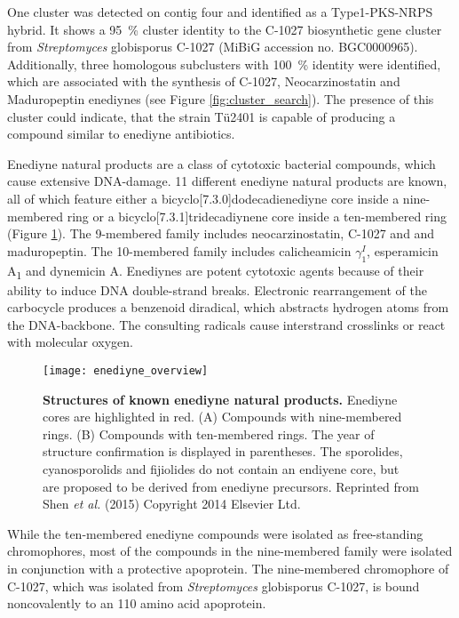 	 One cluster was detected on contig four and identified as a Type1-PKS-NRPS hybrid.
	 It shows a 95~\% cluster identity to the C-1027 biosynthetic gene cluster from \textit{Streptomyces} globisporus C-1027 (MiBiG accession no. BGC0000965). Additionally, three homologous subclusters with 100~\% identity were identified, which are associated with the synthesis of C-1027, Neocarzinostatin and Maduropeptin enediynes (see Figure \ref{fig:cluster_search}).
	 The presence of this cluster could indicate, that the strain Tü2401 is capable of producing a compound similar to enediyne antibiotics. 
	 
	 Enediyne natural products are a class of cytotoxic bacterial compounds, which cause extensive DNA-damage.\autocite{Liang2010,Gredicak2007,AdrianL.Smith*1996,Nicolaou1993}
	 11 different enediyne natural products are known, all of which feature either a bicyclo[7.3.0]dodecadienediyne core inside a nine-membered ring or a bicyclo[7.3.1]tridecadiynene core inside a ten-membered ring (Figure \ref{fig:enediyne_comparison}).
	 The 9-membered family includes neocarzinostatin, C-1027 and and maduropeptin.
	 The 10-membered family includes calicheamicin $\gamma_{1}^{I}$, esperamicin A\textsubscript{1} and dynemicin A.\autocite{Liang2010}
	 Enediynes are potent cytotoxic agents because of their ability to induce DNA double-strand breaks.\autocite{Shen2015}
	 Electronic rearrangement of the carbocycle produces a benzenoid diradical, which abstracts hydrogen atoms from the DNA-backbone.
	 The consulting radicals cause interstrand crosslinks or react with molecular oxygen.	 
	 \begin{figure}[htbp]
	 	\centering
	 	\texttt{[image: enediyne\_overview]}
	 	\caption[Structures of known enediyne natural products]{%
	 		\textbf{Structures of known enediyne natural products.}
	 		Enediyne cores are highlighted in red.
	 		(A) Compounds with nine-membered rings.
	 		(B) Compounds with ten-membered rings.
	 		The year of structure confirmation is displayed in parentheses.
	 		The sporolides, cyanosporolids and fijiolides do not contain an endiyene core, but are proposed to be derived from enediyne precursors.
	 		Reprinted from Shen \textit{et al.} (2015) Copyright 2014 Elsevier Ltd.}
	 	\label{fig:enediyne_comparison}
	 \end{figure}
	 While the ten-membered enediyne compounds were isolated as free-standing chromophores, most of the compounds in the nine-membered family were isolated in conjunction with a protective apoprotein.\autocite{Liang2010}
	 The nine-membered chromophore of C-1027, which was isolated from \textit{Streptomyces} globisporus C-1027, is bound noncovalently to an 110 amino acid apoprotein.\autocite{AdrianL.Smith*1996,Minami1993,Yoshida1993,Otani1993,Sugiura1993,Matsumoto1993,Otani1991,Otani1988a,Matsumoto1993a}

